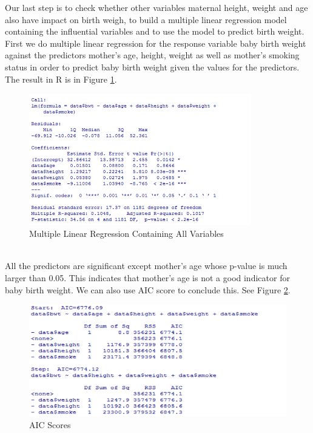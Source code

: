 \documentclass[oneside,12pt]{report}
\begin{document}
\indent Our last step is to check whether other variables maternal height, weight and age also have impact on birth weigh, to build a multiple linear regression model containing the influential variables and to use the model to predict birth weight.\\
\indent First we do multiple linear regression for the response variable baby birth weight against the predictors mother’s age, height, weight as well as mother’s smoking status in order to predict baby birth weight given the values for the predictors. The result in R is in Figure \ref{fig:mlr4}.\\
\begin{figure}[htb]
    \begin{center}
        \includegraphics[width=0.863\textwidth]{mlr4.png}
    \end{center}
    \caption{Multiple Linear Regression Containing All Variables}
    \label{fig:mlr4}
\end{figure}\\
\indent All the predictors are significant except mother’s age whose p-value is much larger than 0.05. This indicates that mother’s age is not a good indicator for baby birth weight. We can also use AIC score to conclude this. See Figure \ref{fig:aic}.
\begin{figure}[htb]
    \begin{center}
        \includegraphics[width=\textwidth]{aic.png}
    \end{center}
    \caption{AIC Scores}
    \label{fig:aic}
\end{figure}\\
\end{document}
